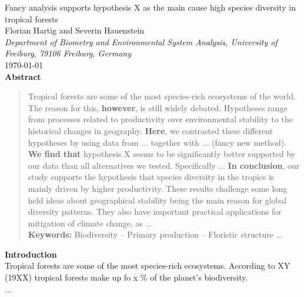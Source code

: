 \documentclass{tufte-book}
\begin{document}
\begin{center}
	\huge{Fancy analysis supports hypothesis X as the main cause high species diversity in tropical forests} \\ 
	\vspace{0.3em}
	\large{Florian Hartig and Severin Hauenstein}\\
	\vspace{0.3em}
	\small{\textit{Department of Biometry and Environmental System Analysis, University of Freiburg, 79106 Freiburg, Germany}}\\
	\vspace{1em}
	\large{\today}\\
	\vspace{2em}
	\textbf{Abstract}\\ 
\end{center}
\begin{quote}
Tropical forests are some of the most species-rich ecosystems of the world.
The reason for this, \textbf{however}, is still widely debated. Hypotheses range from processes related to productivity over environmental stability to the historical changes in geography.
\textbf{Here}, we contrasted these different hypotheses by using data from ... together with ... (fancy new method).
\textbf{We find that} hypothesis X seems to be significantly better supported by our data
than all alternatives we tested. Specifically ... 
\textbf{In conclusion}, our study supports the hypothesis that species diversity in the
tropics is mainly driven by higher productivity. These results challenge some long held
ideas about geographical stability being the main reason for global diversity
patterns. They also have important practical applications for mitigation of climate
change, as ...\\[0.3cm]
\noindent\textbf{Keywords:} Biodiversity -- Primary production -- Floristic structure ...\\
\end{quote}

\noindent\textbf{Introduction}\\
Tropical forests are some of the most species-rich ecosystems. According to XY (19XX) tropical forests make up fo x \% of the planet's biodiversity.\\
...
\end{document}
